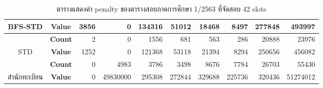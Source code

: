 \begin{table}[]
{\begin{tabular}{@{}ccrrrrrrrr@{}}
    \multirow{-2}{*}{BFS-STD}                    & \textbf{Value}                        & 3856                        & 0                        & 134316                        & 51012                        & 18468                        & 8497                        & 277848                        & 493997                        \\ \midrule
    {\color[HTML]{FE0000} }                      & {\color[HTML]{FE0000} \textbf{Count}} & {\color[HTML]{FE0000} 2}    & {\color[HTML]{FE0000} 0} & {\color[HTML]{FE0000} 1556}   & {\color[HTML]{FE0000} 681}   & {\color[HTML]{FE0000} 563}   & {\color[HTML]{FE0000} 286}  & {\color[HTML]{FE0000} 20888}  & {\color[HTML]{FE0000} 23976}  \\ \cmidrule(l){2-10} 
    \multirow{-2}{*}{{\color[HTML]{FE0000} STD}} & {\color[HTML]{FE0000} \textbf{Value}} & {\color[HTML]{FE0000} 1252} & {\color[HTML]{FE0000} 0} & {\color[HTML]{FE0000} 121368} & {\color[HTML]{FE0000} 53118} & {\color[HTML]{FE0000} 21394} & {\color[HTML]{FE0000} 8294} & {\color[HTML]{FE0000} 250656} & {\color[HTML]{FE0000} 456082} \\ \midrule
                                                 & \textbf{Count}                        & 0                           & 4983                     & 3786                           & 3498                           & 8676                           & 7784                   & 26703                         & 55430                         \\ \cmidrule(l){2-10} 
    \multirow{-2}{*}{สำนักทะเบียน}                  & \textbf{Value}                        & 0                           & 49830000                 & 295308                         & 272844                         & 329688                         & 225736                 & 320436                        & 51274012                      \\ \bottomrule
    \end{tabular}%
    }
    \caption{ตารางแสดงค่า penalty ของตารางสอบภาคการศึกษา 1/2563 ที่จัดสอบ 42 slots}
    \label{tab:result_table_163}
\end{table}
